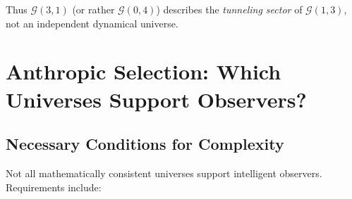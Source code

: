 \documentclass[11pt,a4paper]{article}
\numberwithin{equation}{section}
\theoremstyle{plain}
\theoremstyle{definition}
\theoremstyle{remark}
\newcommand{\Cl}{\mathcal{G}}               %
\begin{document}
Thus $\Cl(3,1)$ (or rather $\Cl(0,4)$) describes the \emph{tunneling sector} of $\Cl(1,3)$, not an independent dynamical universe.

\section{Anthropic Selection: Which Universes Support Observers?}
\label{sec:anthropic}

\subsection{Necessary Conditions for Complexity}

Not all mathematically consistent universes support intelligent observers. Requirements include:
\end{document}
